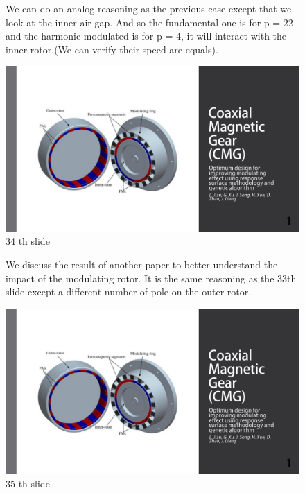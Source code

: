 \begin{figure}[H]
    \begin{minipage}{.45\linewidth}
    We can do an analog reasoning as the previous case except that we look at the inner air gap. And so the fundamental one is for p = 22 and the harmonic modulated is for p = 4, it will interact with the inner rotor.(We can verify their speed are equals).
       
    \end{minipage}
    \hfill%
    \begin{minipage}[c]{.45\linewidth}
        \centering
        \includegraphics[page={34},width=\textwidth]{LELEC2311.allow.pdf}
        \caption{34 th slide}
    \end{minipage}
\end{figure}

\begin{figure}[H]
    \begin{minipage}{.45\linewidth}
    We discuss the result of another paper to better understand the impact of the modulating rotor. It is the same reasoning as the 33th slide except a different number of pole on the outer rotor.
       
    \end{minipage}
    \hfill%
    \begin{minipage}[c]{.45\linewidth}
        \centering
        \includegraphics[page={35},width=\textwidth]{LELEC2311.allow.pdf}
        \caption{35 th slide}
    \end{minipage}
\end{figure}

